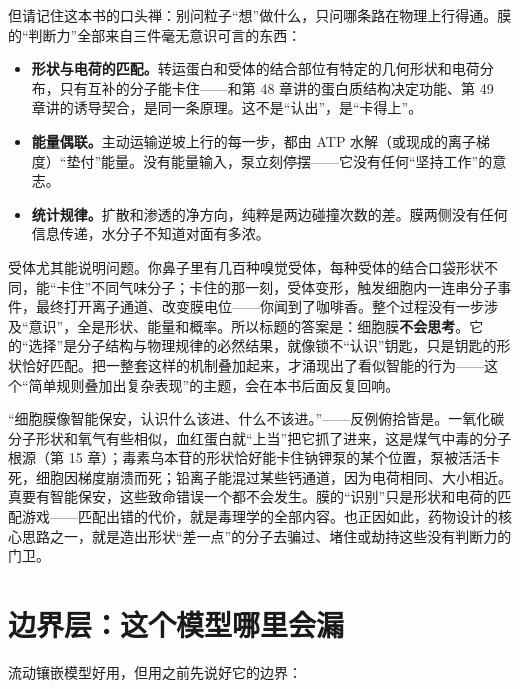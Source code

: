 但请记住这本书的口头禅：别问粒子“想”做什么，只问哪条路在物理上行得通。膜的“判断力”全部来自三件毫无意识可言的东西：

\begin{itemize}[itemsep=2pt]
\item \textbf{形状与电荷的匹配。}转运蛋白和受体的结合部位有特定的几何形状和电荷分布，只有互补的分子能卡住——和第 48 章讲的蛋白质结构决定功能、第 49 章讲的诱导契合，是同一条原理。这不是“认出”，是“卡得上”。
\item \textbf{能量偶联。}主动运输逆坡上行的每一步，都由 ATP 水解（或现成的离子梯度）“垫付”能量。没有能量输入，泵立刻停摆——它没有任何“坚持工作”的意志。
\item \textbf{统计规律。}扩散和渗透的净方向，纯粹是两边碰撞次数的差。膜两侧没有任何信息传递，水分子不知道对面有多浓。
\end{itemize}

受体尤其能说明问题。你鼻子里有几百种嗅觉受体，每种受体的结合口袋形状不同，能“卡住”不同气味分子；卡住的那一刻，受体变形，触发细胞内一连串分子事件，最终打开离子通道、改变膜电位——你闻到了咖啡香。整个过程没有一步涉及“意识”，全是形状、能量和概率。所以标题的答案是：细胞膜\textbf{不会思考}。它的“选择”是分子结构与物理规律的必然结果，就像锁不“认识”钥匙，只是钥匙的形状恰好匹配。把一整套这样的机制叠加起来，才涌现出了看似智能的行为——这个“简单规则叠加出复杂表现”的主题，会在本书后面反复回响。

\begin{wuqu}
“细胞膜像智能保安，认识什么该进、什么不该进。”——反例俯拾皆是。一氧化碳分子形状和氧气有些相似，血红蛋白就“上当”把它抓了进来，这是煤气中毒的分子根源（第 15 章）；毒素乌本苷的形状恰好能卡住钠钾泵的某个位置，泵被活活卡死，细胞因梯度崩溃而死；铅离子能混过某些钙通道，因为电荷相同、大小相近。真要有智能保安，这些致命错误一个都不会发生。膜的“识别”只是形状和电荷的匹配游戏——匹配出错的代价，就是毒理学的全部内容。也正因如此，药物设计的核心思路之一，就是造出形状“差一点”的分子去骗过、堵住或劫持这些没有判断力的门卫。
\end{wuqu}

\section{边界层：这个模型哪里会漏}

流动镶嵌模型好用，但用之前先说好它的边界：

